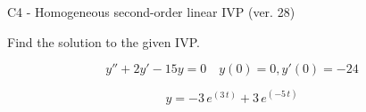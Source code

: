 \begin{exercise}
  \begin{exerciseTitle}C4 - Homogeneous second-order linear IVP (ver. 28)\end{exerciseTitle}
  \begin{exerciseStatement}
    
Find the solution to the given IVP.

    
\[y''+2y'-15y = 0 \hspace{1em} y(0) = 0 , y'(0) = -24\]

  \end{exerciseStatement}
  \begin{exerciseAnswer}
    
\[y= -3 \, e^{\left(3 \, t\right)} + 3 \, e^{\left(-5 \, t\right)}\]

  \end{exerciseAnswer}
\end{exercise}